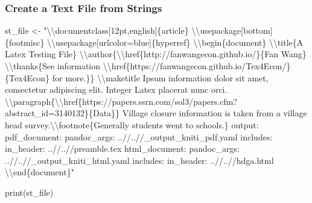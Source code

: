 \documentclass[
]{book}
\newenvironment{Shaded}{\begin{snugshade}}{\end{snugshade}}
\newcommand{\FunctionTok}[1]{\textcolor[rgb]{0.00,0.00,0.00}{#1}}
\newcommand{\NormalTok}[1]{#1}
\newcommand{\OtherTok}[1]{\textcolor[rgb]{0.56,0.35,0.01}{#1}}
\newcommand{\SpecialCharTok}[1]{\textcolor[rgb]{0.00,0.00,0.00}{#1}}
\newcommand{\StringTok}[1]{\textcolor[rgb]{0.31,0.60,0.02}{#1}}
\begin{document}
\hypertarget{create-a-text-file-from-strings}{%
\subsubsection{Create a Text File from Strings}\label{create-a-text-file-from-strings}}

\begin{Shaded}
\begin{Highlighting}[]
\NormalTok{st\_file }\OtherTok{\textless{}{-}} \StringTok{"}\SpecialCharTok{\textbackslash{}\textbackslash{}}\StringTok{documentclass[12pt,english]\{article\}}
\SpecialCharTok{\textbackslash{}\textbackslash{}}\StringTok{usepackage[bottom]\{footmisc\}}
\SpecialCharTok{\textbackslash{}\textbackslash{}}\StringTok{usepackage[urlcolor=blue]\{hyperref\}}
\SpecialCharTok{\textbackslash{}\textbackslash{}}\StringTok{begin\{document\}}
\SpecialCharTok{\textbackslash{}\textbackslash{}}\StringTok{title\{A Latex Testing File\}}
\SpecialCharTok{\textbackslash{}\textbackslash{}}\StringTok{author\{}\SpecialCharTok{\textbackslash{}\textbackslash{}}\StringTok{href\{http://fanwangecon.github.io/\}\{Fan Wang\} }\SpecialCharTok{\textbackslash{}\textbackslash{}}\StringTok{thanks\{See information }\SpecialCharTok{\textbackslash{}\textbackslash{}}\StringTok{href\{https://fanwangecon.github.io/Tex4Econ/\}\{Tex4Econ\} for more.\}\}}
\SpecialCharTok{\textbackslash{}\textbackslash{}}\StringTok{maketitle}
\StringTok{Ipsum information dolor sit amet, consectetur adipiscing elit. Integer Latex placerat nunc orci.}
\SpecialCharTok{\textbackslash{}\textbackslash{}}\StringTok{paragraph\{}\SpecialCharTok{\textbackslash{}\textbackslash{}}\StringTok{href\{https://papers.ssrn.com/sol3/papers.cfm?abstract\_id=3140132\}\{Data\}\}}
\StringTok{Village closure information is taken from a village head survey.}\SpecialCharTok{\textbackslash{}\textbackslash{}}\StringTok{footnote\{Generally students went to schools.\}}
\StringTok{output:}
\StringTok{  pdf\_document:}
\StringTok{    pandoc\_args: \textquotesingle{}..//..//\_output\_kniti\_pdf.yaml\textquotesingle{}}
\StringTok{    includes:}
\StringTok{      in\_header: \textquotesingle{}..//..//preamble.tex\textquotesingle{}}
\StringTok{  html\_document:}
\StringTok{    pandoc\_args: \textquotesingle{}..//..//\_output\_kniti\_html.yaml\textquotesingle{}}
\StringTok{    includes:}
\StringTok{      in\_header: \textquotesingle{}..//..//hdga.html\textquotesingle{}}
\SpecialCharTok{\textbackslash{}\textbackslash{}}\StringTok{end\{document\}"}

\FunctionTok{print}\NormalTok{(st\_file)}
\end{Highlighting}
\end{Shaded}
\end{document}
